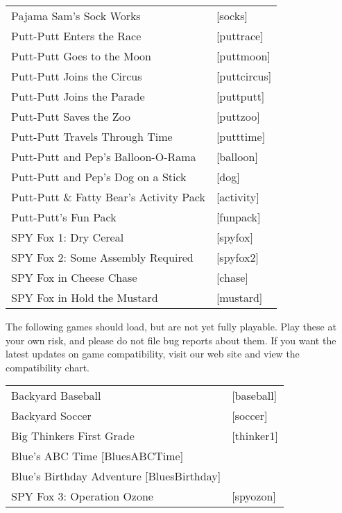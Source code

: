 \begin{itemize}
\begin{tabular}[h]{ll}
    Pajama Sam's Sock Works&                       [socks]\\
    Putt-Putt Enters the Race&                     [puttrace]\\
    Putt-Putt Goes to the Moon&                    [puttmoon]\\
    Putt-Putt Joins the Circus&                    [puttcircus]\\
    Putt-Putt Joins the Parade&                    [puttputt]\\
    Putt-Putt Saves the Zoo&                       [puttzoo]\\
    Putt-Putt Travels Through Time&                [putttime]\\
    Putt-Putt and Pep's Balloon-O-Rama&            [balloon]\\
    Putt-Putt and Pep's Dog on a Stick&            [dog]\\
    Putt-Putt \& Fatty Bear's Activity Pack&       [activity]\\
    Putt-Putt's Fun Pack&                          [funpack]\\
    SPY Fox 1: Dry Cereal&                         [spyfox]\\
    SPY Fox 2: Some Assembly Required&             [spyfox2]\\
    SPY Fox in Cheese Chase&                       [chase]\\
    SPY Fox in Hold the Mustard&                   [mustard]\\
  \end{tabular}

The following games should load, but are not yet fully playable. Play these at
your own risk, and please do not file bug reports about them. If you want
the latest updates on game compatibility, visit our web site and view the
compatibility chart.

  \begin{tabular}{ll}
    Backyard Baseball&                             [baseball]\\
    Backyard Soccer&                               [soccer]\\
    Big Thinkers First Grade&                      [thinker1]\\
    Blue's ABC Time                                [BluesABCTime]\\
    Blue's Birthday Adventure                      [BluesBirthday]\\
    SPY Fox 3: Operation Ozone&                    [spyozon]\\
  \end{tabular}


\end{itemize}
